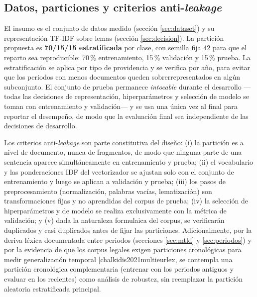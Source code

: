 \documentclass[11pt]{tg_usta}
\makeatletter
\renewcommand{\cite}{\@ifnextchar[{\@tempswatrue\@citex}{\@tempswafalse\@citex[]}}
\makeatother
\begin{document}
\subsection{Datos, particiones y criterios anti-\emph{leakage}}
\label{sec:particiones}
El insumo es el conjunto de datos medido (sección \ref{sec:dataset}) y su representación TF-IDF sobre lemas (sección \ref{sec:decision}). La partición propuesta es \textbf{70/15/15 estratificada} por clase, con semilla fija 42 para que el reparto sea reproducible: 70\,\% entrenamiento, 15\,\% validación y 15\,\% prueba. La estratificación se aplica por tipo de providencia y se verifica por año, para evitar que los periodos con menos documentos queden sobrerrepresentados en algún subconjunto. El conjunto de prueba permanece \emph{intocable} durante el desarrollo ---todas las decisiones de representación, hiperparámetros y selección de modelo se toman con entrenamiento y validación--- y se usa una única vez al final para reportar el desempeño, de modo que la evaluación final sea independiente de las decisiones de desarrollo.

Los criterios anti-\emph{leakage} son parte constitutiva del diseño: (i) la partición es a nivel de documento, nunca de fragmentos, de modo que ninguna parte de una sentencia aparece simultáneamente en entrenamiento y prueba; (ii) el vocabulario y las ponderaciones IDF del vectorizador se ajustan solo con el conjunto de entrenamiento y luego se aplican a validación y prueba; (iii) los pasos de preprocesamiento (normalización, palabras vacías, lematización) son transformaciones fijas y no aprendidas del corpus de prueba; (iv) la selección de hiperparámetros y de modelo se realiza exclusivamente con la métrica de validación; y (v) dada la naturaleza formulaica del corpus, se verificarán duplicados y casi duplicados antes de fijar las particiones. Adicionalmente, por la deriva léxica documentada entre periodos (secciones \ref{sec:mtld} y \ref{sec:periodos}) y por la evidencia de que los corpus legales exigen particiones cronológicas para medir generalización temporal \cite{chalkidis2021multieurlex}, se contempla una partición cronológica complementaria (entrenar con los periodos antiguos y evaluar en los recientes) como análisis de robustez, sin reemplazar la partición aleatoria estratificada principal.
\end{document}
